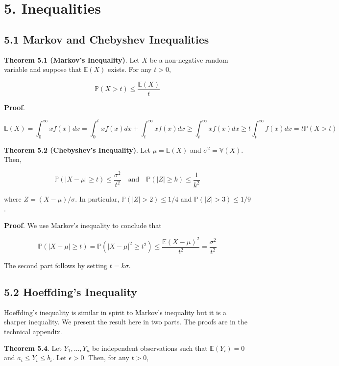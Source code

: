 \section{5. Inequalities}\label{inequalities}

\subsection{5.1 Markov and Chebyshev
Inequalities}\label{markov-and-chebyshev-inequalities}

\textbf{Theorem 5.1 (Markov's Inequality)}. Let \(X\) be a non-negative
random variable and suppose that \(\mathbb{E}(X)\) exists. For any
\(t > 0\),

\[ \mathbb{P}(X > t) \leq \frac{\mathbb{E}(X)}{t} \]

\textbf{Proof}.

\[ 
\mathbb{E}(X)
=\int_0^\infty xf(x) dx
=\int_0^t xf(x) dx + \int_t^\infty xf(x) dx
\geq \int_t^\infty xf(x) dx
\geq t \int_t^\infty f(x) dx
= t \mathbb{P}(X > t)
\]

\textbf{Theorem 5.2 (Chebyshev's Inequality)}. Let
\(\mu = \mathbb{E}(X)\) and \(\sigma^2 = \mathbb{V}(X)\). Then,

\[ \mathbb{P}(|X - \mu| \geq t) \leq \frac{\sigma^2}{t^2} 
\quad \text{and} \quad
\mathbb{P}(|Z| \geq k) \leq \frac{1}{k^2} \]

where \(Z = (X - \mu) / \sigma\). In particular,
\(\mathbb{P}(|Z| > 2) \leq 1/4\) and \(\mathbb{P}(|Z| > 3) \leq 1/9\).

\textbf{Proof}. We use Markov's inequality to conclude that

\[ \mathbb{P}(|X - \mu| \geq t) = \mathbb{P}(|X - \mu|^2 \geq t^2) \leq \frac{\mathbb{E}(X - \mu)^2}{t^2} = \frac{\sigma^2}{t^2} \]

The second part follows by setting \(t = k \sigma\).

\subsection{5.2 Hoeffding's Inequality}\label{hoeffdings-inequality}

Hoeffding's inequality is similar in spirit to Markov's inequality but
it is a sharper inequality. We present the result here in two parts. The
proofs are in the technical appendix.

\textbf{Theorem 5.4}. Let \(Y_1, \dots, Y_n\) be independent
observations such that \(\mathbb{E}(Y_i) = 0\) and
\(a_i \leq Y_i \leq b_i\). Let \(\epsilon > 0\). Then, for any
\(t > 0\),

